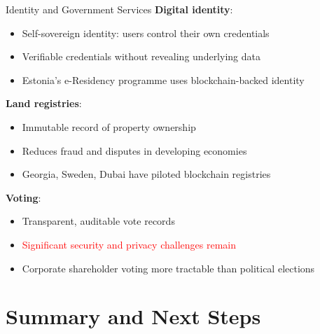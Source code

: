 \documentclass[10pt]{beamer}
\newcommand{\bad}[1]{\textcolor{red}{#1}}
\begin{document}
\begin{frame}{Identity and Government Services}
  \textbf{Digital identity}:
  \begin{itemize}
    \item Self-sovereign identity: users control their own credentials
    \item Verifiable credentials without revealing underlying data
    \item Estonia's e-Residency programme uses blockchain-backed identity
  \end{itemize}
  
  \vspace{0.5em}
  \textbf{Land registries}:
  \begin{itemize}
    \item Immutable record of property ownership
    \item Reduces fraud and disputes in developing economies
    \item Georgia, Sweden, Dubai have piloted blockchain registries
  \end{itemize}
  
  \vspace{0.5em}
  \textbf{Voting}:
  \begin{itemize}
    \item Transparent, auditable vote records
    \item \bad{Significant security and privacy challenges remain}
    \item Corporate shareholder voting more tractable than political elections
  \end{itemize}
\end{frame}

\section{Summary and Next Steps}
\end{document}

